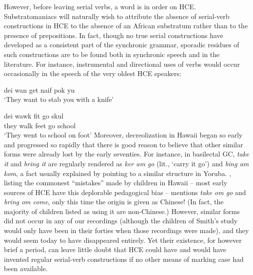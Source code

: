 However, before leaving serial verbs, a word is in order on HCE. Substratomaniacs will naturally wish to attribute the absence of serial-verb constructions in HCE to the absence of an African substratum rather than to the presence of prepositions. In fact, though no true serial constructions have developed as a consistent part of the synchronic grammar, sporadic residues of such constructions are to be found both in synchronic speech and in the literature. For instance, instrumental and directional uses of verbs would occur occasionally in the speech of the very oldest HCE speakers:

\ea\label{ex:2:263}
dei wan get naif pok yu\\
\glt `They want to stab you with a knife'
\z

\ea\label{ex:2:264}
\gll dei wawk fit go skul\\
they walk feet go school\\
\glt `They went to school on foot'
\z
Moreover, decreolization in Hawaii began so early and progressed so rapidly that there is good reason to believe that other similar forms were already lost by the early seventies. For instance, in basilectal GC, \textit{take it} and \textit{bring it} are regularly rendered as \textit{ker am go} (lit., `carry it go') and \textit{bing am kom}, a fact usually explained by pointing to a similar structure in Yoruba. \citet{Smith1939}, listing the commonest ``mistakes''
made by children in Hawaii -- most early sources of HCE have this deplorable pedagogical bias -- mentions \textit{take om go} and \textit{bring om come}, only this time the origin is given as Chinese! (In fact, the majority of children listed as using it are non-Chinese.) However, similar forms did not occur in any of our recordings (although the children of Smith's study would only have been in their forties when those recordings were made), and they would seem today to have disappeared entirely. Yet their existence, for however brief a period, can leave little doubt that HCE could have and would have invented regular serial-verb constructions if no other means of marking case had been available.
